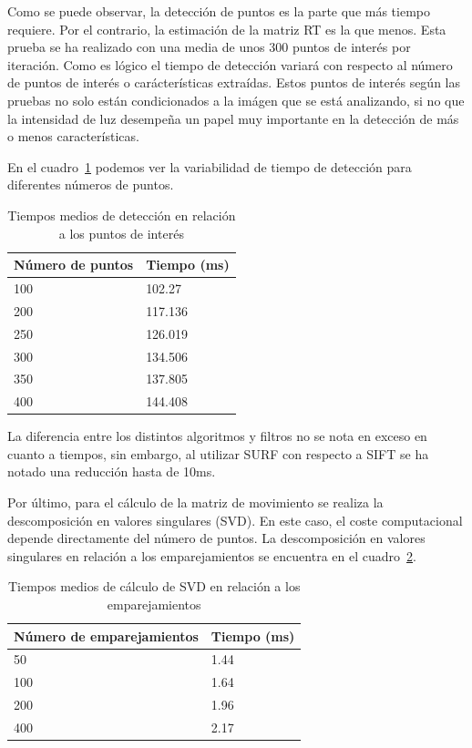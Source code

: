 Como se puede observar, la detección de puntos es la parte que más tiempo requiere. Por el contrario, la estimación de la matriz RT es la que menos. Esta prueba se ha realizado con una media de unos 300 puntos de interés por iteración. Como es lógico el tiempo de detección variará con respecto al número de puntos de interés o carácterísticas extraídas. Estos puntos de interés según las pruebas no solo están condicionados a la imágen que se está analizando, si no que la intensidad de luz desempeña un papel muy importante en la detección de más o menos características.

En el cuadro~\ref{tab:detection-time} podemos ver la variabilidad de tiempo de detección para diferentes números de puntos.

\begin{table}[h]
\caption{Tiempos medios de detección en relación a los puntos de interés}
\label{tab:detection-time}
\centering
\begin{tabular}{ l | l }
\toprule
\textbf{Número de puntos} & \textbf{Tiempo (ms)}\\
\hline\hline
100 & 102.27\\
\hline
200 & 117.136\\
\hline
250 & 126.019\\
\hline
300 & 134.506\\
\hline
350 & 137.805\\
\hline
400 & 144.408\\
\bottomrule
\end{tabular}
\end{table}


La diferencia entre los distintos algoritmos y filtros no se nota en exceso en cuanto a tiempos, sin embargo, al utilizar SURF con respecto a SIFT se ha notado una reducción hasta de 10ms.

Por último, para el cálculo de la matriz de movimiento se realiza la descomposición en valores singulares (SVD). En este caso, el coste computacional depende directamente del número de puntos. La descomposición en valores singulares en relación a los emparejamientos se encuentra en el cuadro~\ref{tab:svd-time}.

\begin{table}
\caption{Tiempos medios de cálculo de SVD en relación a los emparejamientos}
\label{tab:svd-time}
\centering
\begin{tabular}{ l | l }
\toprule
\textbf{Número de emparejamientos} & \textbf{Tiempo (ms)}\\
\hline\hline
50 & 1.44\\
\hline
100 & 1.64\\
\hline
200 & 1.96\\
\hline
400 & 2.17\\
\bottomrule
\end{tabular}
\end{table}

